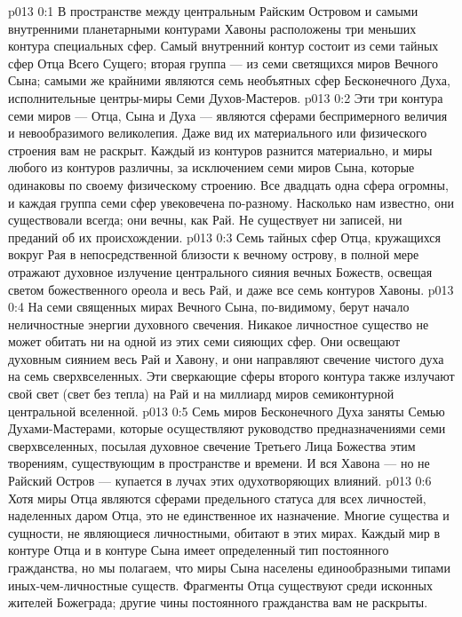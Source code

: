 \author{Совершенствователь Мудрости}
\vs p013 0:1 В пространстве между центральным Райским Островом и самыми внутренними планетарными контурами Хавоны расположены три меньших контура специальных сфер. Самый внутренний контур состоит из семи тайных сфер Отца Всего Сущего; вторая группа --- из семи светящихся миров Вечного Сына; самыми же крайними являются семь необъятных сфер Бесконечного Духа, исполнительные центры\hyp{}миры Семи Духов\hyp{}Мастеров.
\vs p013 0:2 Эти три контура семи миров --- Отца, Сына и Духа --- являются сферами беспримерного величия и невообразимого великолепия. Даже вид их материального или физического строения вам не раскрыт. Каждый из контуров разнится материально, и миры любого из контуров различны, за исключением семи миров Сына, которые одинаковы по своему физическому строению. Все двадцать одна сфера огромны, и каждая группа семи сфер увековечена по\hyp{}разному. Насколько нам известно, они существовали всегда; они вечны, как Рай. Не существует ни записей, ни преданий об их происхождении.
\vs p013 0:3 \pc Семь тайных сфер Отца, кружащихся вокруг Рая в непосредственной близости к вечному острову, в полной мере отражают духовное излучение центрального сияния вечных Божеств, освещая светом божественного ореола и весь Рай, и даже все семь контуров Хавоны.
\vs p013 0:4 \pc На семи священных мирах Вечного Сына, по\hyp{}видимому, берут начало неличностные энергии духовного свечения. Никакое личностное существо не может обитать ни на одной из этих семи сияющих сфер. Они освещают духовным сиянием весь Рай и Хавону, и они направляют свечение чистого духа на семь сверхвселенных. Эти сверкающие сферы второго контура также излучают свой свет (свет без тепла) на Рай и на миллиард миров семиконтурной центральной вселенной.
\vs p013 0:5 \pc Семь миров Бесконечного Духа заняты Семью Духами\hyp{}Мастерами, которые осуществляют руководство предназначениями семи сверхвселенных, посылая духовное свечение Третьего Лица Божества этим творениям, существующим в пространстве и времени. И вся Хавона --- но не Райский Остров --- купается в лучах этих одухотворяющих влияний.
\vs p013 0:6 \pc Хотя миры Отца являются сферами предельного статуса для всех личностей, наделенных даром Отца, это не единственное их назначение. Многие существа и сущности, не являющиеся личностными, обитают в этих мирах. Каждый мир в контуре Отца и в контуре Сына имеет определенный тип постоянного гражданства, но мы полагаем, что миры Сына населены единообразными типами иных\hyp{}чем\hyp{}личностные существ. Фрагменты Отца существуют среди исконных жителей Божеграда; другие чины постоянного гражданства вам не раскрыты.

